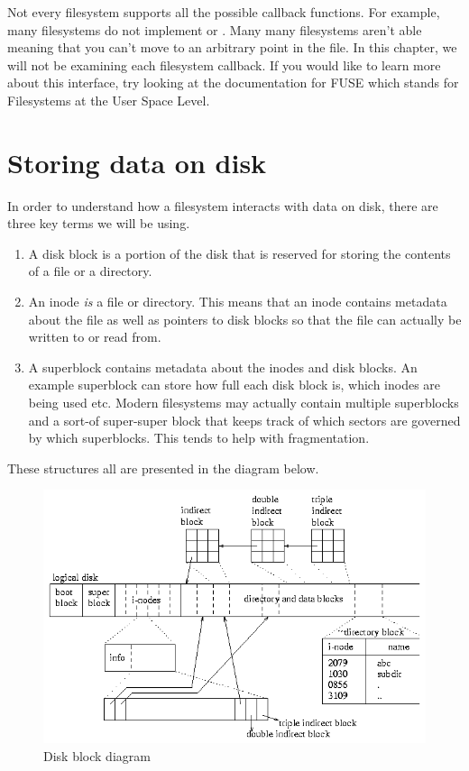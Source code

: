 Not every filesystem supports all the possible callback functions.
For example, many filesystems do not implement  or .
Many many filesystems aren't able meaning that you can't move to an arbitrary point in the file.
In this chapter, we will not be examining each filesystem callback.
If you would like to learn more about this interface, try looking at the documentation for FUSE which stands for Filesystems at the User Space Level.

\section{Storing data on disk}

In order to understand how a filesystem interacts with data on disk, there are three key terms we will be using.
\begin{enumerate}
  \item {} A disk block is a portion of the disk that is reserved for storing the contents of a file or a directory.
  \item {} An inode \emph{is} a file or directory.
    This means that an inode contains metadata about the file as well as pointers to disk blocks so that the file can actually be written to or read from.
  \item {} A superblock contains metadata about the inodes and disk blocks.
    An example superblock can store how full each disk block is, which inodes are being used etc.
    Modern filesystems may actually contain multiple superblocks and a sort-of super-super block that keeps track of which sectors are governed by which superblocks.
    This tends to help with fragmentation.
\end{enumerate}

These structures all are presented in the diagram below.

\begin{figure}[htbp]
\centering
\includegraphics[width=.8\textwidth]{filesystems/images/disk.gif}
\caption{Disk block diagram}
\end{figure}

